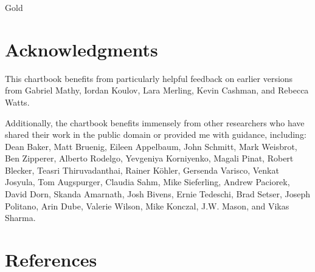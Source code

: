 \begin{minipage}{0.76\textwidth}
\normalsize Gold
\vspace*{-1mm}

\small 
{}

\vspace{2.4cm}

\hspace{7mm} 

\end{minipage}
\newpage
%
%
\thispagestyle{sectpage}
\section*{Acknowledgments}
\begin{minipage}{0.76\textwidth}
\small This chartbook benefits from particularly helpful feedback on earlier versions from Gabriel Mathy, Iordan Koulov, Lara Merling, Kevin Cashman, and Rebecca Watts. 

Additionally, the chartbook benefits immensely from other researchers who have shared their work in the public domain or provided me with guidance, including: Dean Baker, Matt Bruenig, Eileen Appelbaum, John Schmitt, Mark Weisbrot, Ben Zipperer, Alberto Rodelgo, Yevgeniya Korniyenko, Magali Pinat, Robert Blecker, Teasri Thiruvadanthai, Rainer K\"ohler, Gersenda Varisco, Venkat Josyula, Tom Augspurger, Claudia Sahm, Mike Sieferling, Andrew Paciorek, David Dorn, Skanda Amarnath, Josh Bivens, Ernie Tedeschi, Brad Setser, Joseph Politano, Arin Dube, Valerie Wilson, Mike Konczal, J.W. Mason, and Vikas Sharma.
\end{minipage}
\newpage
{}
\hypertarget{glossary}{\label{glossary}}

\newpage
\thispagestyle{sectpage}
\hypertarget{references}{\label{references}}
\section*{References}

